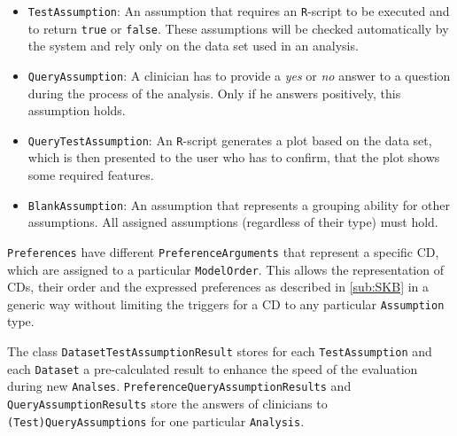 \begin{itemize}

	\item \texttt{TestAssumption}: An assumption that requires an \texttt{R}-script to be executed and to return \texttt{true} or \texttt{false}. These assumptions will be checked automatically by the system and rely only on the data set used in an analysis.
	\item \texttt{QueryAssumption}: A clinician has to provide a \textit{yes} or \textit{no} answer to a question during the process of the analysis. Only if he answers positively, this assumption holds.
	\item \texttt{QueryTestAssumption}: An \texttt{R}-script generates a plot based on the data set, which is then presented to the user who has to confirm, that the plot shows some required features.
	\item \texttt{BlankAssumption}: An assumption that represents a grouping ability for other assumptions. All assigned assumptions (regardless of their type) must hold. 
\end{itemize}
\bigskip


\texttt{Preferences} have different \texttt{PreferenceArguments} that represent a specific \gls{CD}, which are assigned to a particular \texttt{ModelOrder}. This allows the representation of \glspl{CD}, their order and the expressed preferences as described in \autoref{sub:SKB} in a generic way without limiting the triggers for a \gls{CD} to any particular \texttt{Assumption} type. 

The class \texttt{DatasetTestAssumptionResult} stores for each \texttt{TestAssumption} and each \texttt{Dataset} a pre-calculated result to enhance the speed of the evaluation during new \texttt{Analses}. \texttt{PreferenceQueryAssumptionResults} and \texttt{QueryAssumptionResults} store the answers of clinicians to \texttt{(Test)QueryAssumptions} for one particular \texttt{Analysis}.
